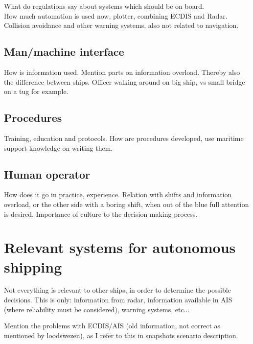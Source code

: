What do regulations say about systems which should be on board. \\
How much automation is used now, plotter, combining ECDIS and Radar. \\
Collision avoidance and other warning systems, also not related to navigation.


\subsection{Man/machine interface}
How is information used. Mention parts on information overload. Thereby also the difference between ships. Officer walking around on big ship, vs small bridge on a tug for example.

\subsection{Procedures}
Training, education and protocols. How are procedures developed, use maritime support knowledge on writing them.

\subsection{Human operator}
How does it go in practice, experience. Relation with shifts and information overload, or the other side with a boring shift, when out of the blue full attention is desired. Importance of culture to the decision making process.

\section{Relevant systems for autonomous shipping}
\label{sec:relevant-systems}
Not everything is relevant to other ships, in order to determine the possible decisions. This is only: information from radar, information available in AIS (where reliability must be considered), warning systems, etc...

Mention the problems with ECDIS/AIS (old information, not correct as mentioned by loodswezen), as I refer to this in snapshots scenario description.